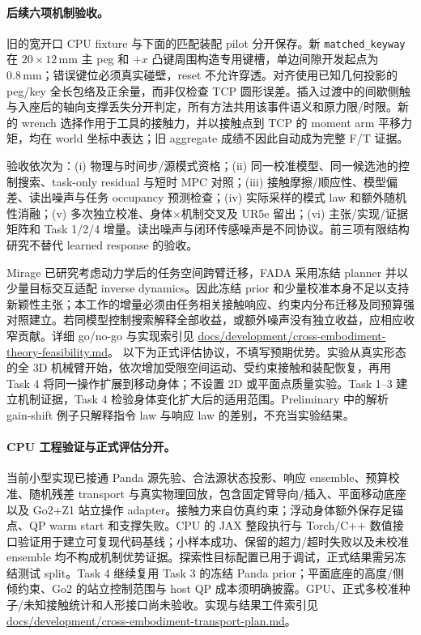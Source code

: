\documentclass[11pt]{article}
\begin{document}
\paragraph{后续六项机制验收。}
旧的宽开口 CPU fixture 与下面的匹配装配 pilot 分开保存。新 \texttt{matched\_keyway} 在 $20\times12\,\mathrm{mm}$ 主 peg 和 $+x$ 凸键周围构造专用键槽，单边间隙开发起点为 $0.8\,\mathrm{mm}$；错误键位必须真实碰壁，reset 不允许穿透。对齐使用已知几何投影的 peg/key 全长包络及正余量，而非仅检查 TCP 圆形误差。插入过渡中的间歇侧触与入座后的轴向支撑丢失分开判定，所有方法共用该事件语义和原力限/时限。新的 wrench 选择作用于工具的接触力，并以接触点到 TCP 的 moment arm 平移力矩，均在 world 坐标中表达；旧 aggregate 成绩不因此自动成为完整 F/T 证据。

验收依次为：(i) 物理与时间步/源模式资格；(ii) 同一校准模型、同一候选池的控制搜索、task-only residual 与短时 MPC 对照；(iii) 接触摩擦/顺应性、模型偏差、读出噪声与任务 occupancy 预测检查；(iv) 实际采样的模式 law 和额外随机性消融；(v) 多次独立校准、身体$\times$机制交叉及 UR5e 留出；(vi) 主张/实现/证据矩阵和 Task 1/2/4 增量。读出噪声与闭环传感噪声是不同协议。前三项有限结构研究不替代 learned response 的验收。

Mirage 已研究考虑动力学后的任务空间跨臂迁移\cite{mirage}，FADA 采用冻结 planner 并以少量目标交互适配 inverse dynamics\cite{fada}。因此冻结 prior 和少量校准本身不足以支持新颖性主张；本工作的增量必须由任务相关接触响应、约束内分布迁移及同预算强对照建立。若同模型控制搜索解释全部收益，或额外噪声没有独立收益，应相应收窄贡献。详细 go/no-go 与实现索引见 \url{docs/development/cross-embodiment-theory-feasibility.md}。
\label{sec:experiments}
以下为正式评估协议，不填写预期优势。实验从真实形态的全 3D 机械臂开始，依次增加受限空间运动、受约束接触和装配恢复，再用 Task 4 将同一操作扩展到移动身体；不设置 2D 或平面点质量实验。Task 1--3 建立机制证据，Task 4 检验身体变化扩大后的适用范围。Preliminary 中的解析 gain-shift 例子只解释指令 law 与响应 law 的差别，不充当实验结果。

\paragraph{CPU 工程验证与正式评估分开。}
当前小型实现已接通 Panda 源先验、合法源状态投影、响应 ensemble、预算校准、随机残差 transport 与真实物理回放，包含固定臂导向/插入、平面移动底座以及 Go2+Z1 站立操作 adapter。接触力来自仿真约束；浮动身体额外保存足锚点、QP warm start 和支撑失败。CPU 的 JAX 整段执行与 Torch/C++ 数值接口验证用于建立可复现代码基线；小样本成功、保留的超力/超时失败以及未校准 ensemble 均不构成机制优势证据。探索性目标配置已用于调试，正式结果需另冻结测试 split。Task 4 继续复用 Task 3 的冻结 Panda prior；平面底座的高度/侧倾约束、Go2 的站立控制范围与 host QP 成本须明确披露。GPU、正式多校准种子/未知接触统计和人形接口尚未验收。实现与结果工件索引见 \url{docs/development/cross-embodiment-transport-plan.md}。
\end{document}
